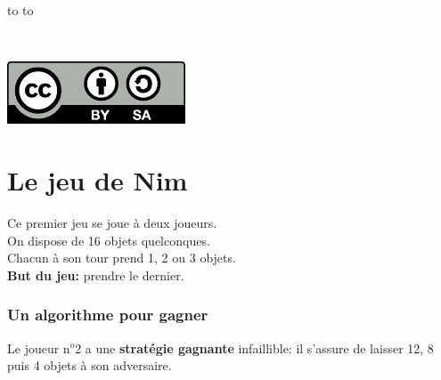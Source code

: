 \documentclass[a7paper,pagesize,DIV=14,10pt]{scrbook}
\begin{document}
\vspace{-.3\baselineskip}
\begin{minipage}{.8\linewidth}
  \begin{spacing}{.5}
    \hbox to \linewidth{\tiny~\hfill Vous pouvez copier, modifier et diffuser librement ce document,}
    \hbox to \linewidth{\tiny~\hfill à la seule condition de laisser ces mêmes droits à vos lecteurs.}
  \end{spacing}
\end{minipage}%
~
\begin{minipage}[b]{.16\linewidth}
  \includegraphics[width=\linewidth]{img/logo_by-sa.pdf}
\end{minipage}%


\section*{Le jeu de Nim}

\vspace{-.5\baselineskip}
Ce premier jeu se joue à deux joueurs.\\
On dispose de 16 objets quelconques.\\
Chacun à son tour prend 1, 2 ou 3 objets.\\
\textbf{But du jeu:} prendre le dernier.

\vspace{-.5\baselineskip}
\subsubsection*{Un algorithme pour gagner}

\vspace{-.5\baselineskip} %
Le joueur n$^o$2 a une \textbf{stratégie gagnante} infaillible: il
s'assure de laisser 12, 8 puis 4 objets à son adversaire.
\end{document}
